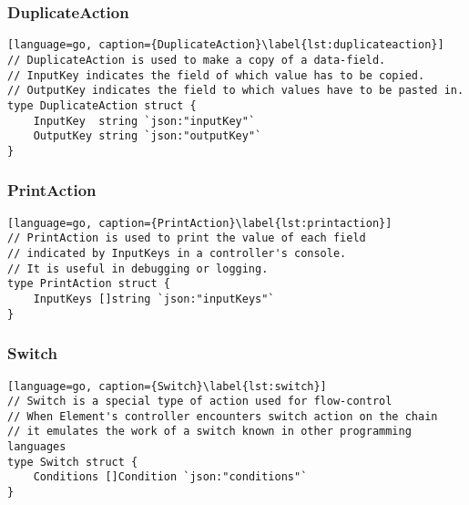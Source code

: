 \subsubsection{DuplicateAction}
\begin{lstlisting}[language=go, caption={DuplicateAction}\label{lst:duplicateaction}]
// DuplicateAction is used to make a copy of a data-field.
// InputKey indicates the field of which value has to be copied.
// OutputKey indicates the field to which values have to be pasted in.
type DuplicateAction struct {
	InputKey  string `json:"inputKey"`
	OutputKey string `json:"outputKey"`
}
\end{lstlisting}

\subsubsection{PrintAction}
\begin{lstlisting}[language=go, caption={PrintAction}\label{lst:printaction}]
// PrintAction is used to print the value of each field 
// indicated by InputKeys in a controller's console.
// It is useful in debugging or logging.
type PrintAction struct {
	InputKeys []string `json:"inputKeys"`
}
\end{lstlisting}

\subsubsection{Switch}
\begin{lstlisting}[language=go, caption={Switch}\label{lst:switch}]
// Switch is a special type of action used for flow-control
// When Element's controller encounters switch action on the chain
// it emulates the work of a switch known in other programming languages
type Switch struct {
	Conditions []Condition `json:"conditions"`
}
\end{lstlisting}

